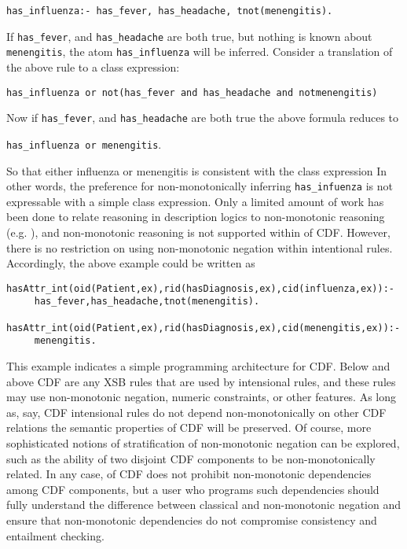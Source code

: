 {\tt has\_influenza:- has\_fever, has\_headache, tnot(menengitis). }

If {\tt has\_fever}, and {\tt has\_headache} are both true, but
nothing is known about {\tt menengitis}, the atom {\tt has\_influenza}
will be inferred.  Consider a translation of the above rule to a class
expression: 

{\tt has\_influenza or not(has\_fever and  has\_headache and notmenengitis) }

Now if {\tt has\_fever}, and {\tt has\_headache} are both true the
above formula reduces to 

{\tt has\_influenza or  menengitis}.

So that either influenza or menengitis is consistent with the class
expression In other words, the preference for non-monotonically
inferring {\tt has\_infuenza} is not expressable with a simple class
expression.  Only a limited amount of work has been done to relate
reasoning in description logics to non-monotonic reasoning
(e.g. \cite{BaaH95}), and non-monotonic reasoning is not supported
within \version{} of CDF.  However, there is no restriction on using
non-monotonic negation within intentional rules.  Accordingly, the
above example could be written as
%
\begin{verbatim}
hasAttr_int(oid(Patient,ex),rid(hasDiagnosis,ex),cid(influenza,ex)):-
     has_fever,has_headache,tnot(menengitis).

hasAttr_int(oid(Patient,ex),rid(hasDiagnosis,ex),cid(menengitis,ex)):-
     menengitis.
\end{verbatim}
%
This example indicates a simple programming architecture for CDF.
Below and above CDF are any XSB rules that are used by intensional
rules, and these rules may use non-monotonic negation, numeric
constraints, or other features.  As long as, say, CDF intensional
rules do not depend non-monotonically on other CDF relations the
semantic properties of CDF will be preserved.  Of course, more
sophisticated notions of stratification of non-monotonic negation can
be explored, such as the ability of two disjoint CDF components to be
non-monotonically related.  In any case, \version{} of CDF does not
prohibit non-monotonic dependencies among CDF components, but a user
who programs such dependencies should fully understand the difference
between classical and non-monotonic negation and ensure that
non-monotonic dependencies do not compromise consistency and
entailment checking.


